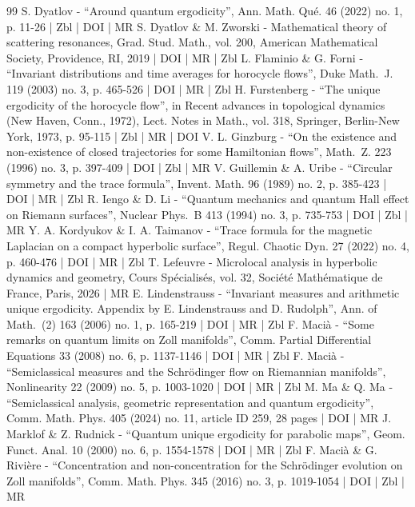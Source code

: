 \begin{thebibliography}{99}
S. Dyatlov - “Around quantum ergodicity”, Ann. Math. Qué. 46 (2022) no. 1, p. 11-26 | Zbl | DOI | MR
S. Dyatlov \& M. Zworski - Mathematical theory of scattering resonances, Grad. Stud. Math., vol. 200, American Mathematical Society, Providence, RI, 2019 | DOI | MR | Zbl
L. Flaminio \& G. Forni - “Invariant distributions and time averages for horocycle flows”, Duke Math. J. 119 (2003) no. 3, p. 465-526 | DOI | MR | Zbl
H. Furstenberg - “The unique ergodicity of the horocycle flow”, in Recent advances in topological dynamics (New Haven, Conn., 1972), Lect. Notes in Math., vol. 318, Springer, Berlin-New York, 1973, p. 95-115 | Zbl | MR | DOI
V. L. Ginzburg - “On the existence and non-existence of closed trajectories for some Hamiltonian flows”, Math. Z. 223 (1996) no. 3, p. 397-409 | DOI | Zbl | MR
V. Guillemin \& A. Uribe - “Circular symmetry and the trace formula”, Invent. Math. 96 (1989) no. 2, p. 385-423 | DOI | MR | Zbl
R. Iengo \& D. Li - “Quantum mechanics and quantum Hall effect on Riemann surfaces”, Nuclear Phys. B 413 (1994) no. 3, p. 735-753 | DOI | Zbl | MR
Y. A. Kordyukov \& I. A. Taimanov - “Trace formula for the magnetic Laplacian on a compact hyperbolic surface”, Regul. Chaotic Dyn. 27 (2022) no. 4, p. 460-476 | DOI | MR | Zbl
T. Lefeuvre - Microlocal analysis in hyperbolic dynamics and geometry, Cours Spécialisés, vol. 32, Société Mathématique de France, Paris, 2026 | MR
E. Lindenstrauss - “Invariant measures and arithmetic unique ergodicity. Appendix by E. Lindenstrauss and D. Rudolph”, Ann. of Math. (2) 163 (2006) no. 1, p. 165-219 | DOI | MR | Zbl
F. Macià - “Some remarks on quantum limits on Zoll manifolds”, Comm. Partial Differential Equations 33 (2008) no. 6, p. 1137-1146 | DOI | MR | Zbl
F. Macià - “Semiclassical measures and the Schrödinger flow on Riemannian manifolds”, Nonlinearity 22 (2009) no. 5, p. 1003-1020 | DOI | MR | Zbl
M. Ma \& Q. Ma - “Semiclassical analysis, geometric representation and quantum ergodicity”, Comm. Math. Phys. 405 (2024) no. 11, article ID 259, 28 pages | DOI | MR
J. Marklof \& Z. Rudnick - “Quantum unique ergodicity for parabolic maps”, Geom. Funct. Anal. 10 (2000) no. 6, p. 1554-1578 | DOI | MR | Zbl
F. Macià \& G. Rivière - “Concentration and non-concentration for the Schrödinger evolution on Zoll manifolds”, Comm. Math. Phys. 345 (2016) no. 3, p. 1019-1054 | DOI | Zbl | MR

\end{thebibliography}
